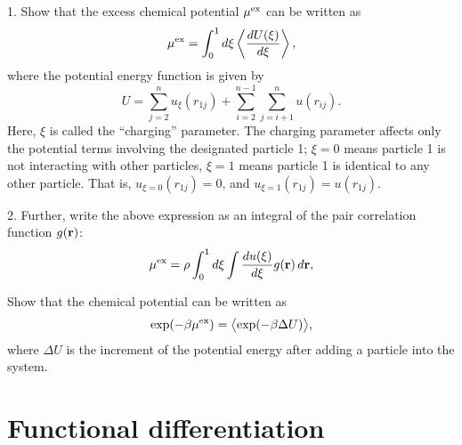 \documentclass[12pt]{book}
\begin{document}






1. Show that the excess chemical potential ${ { \mu }^{ \mathrm{ex} } }$ can be written as
\begin{equation}
  { { \mu }^{ \mathrm{ex} } }
=
  \int_0^1 d\xi \left\langle \frac{d U(\xi)}{d\xi} \right\rangle,
  \label{eq:muti}
\end{equation}
%
where the potential energy function is given by
\[
  U =
  \sum_{j = 2}^n u_\xi(r_{1j})
  +
  \sum_{i = 2}^{n - 1} \sum_{j = i+1}^n u(r_{ij}).
\]
%
Here, $\xi$ is called the ``charging'' parameter.
%
The charging parameter affects only the potential terms involving
the designated particle 1;
$\xi = 0$ means particle 1 is not interacting with other particles,
$\xi = 1$ means particle 1 is identical to any other particle.
%
That is,
$u_{\xi = 0}(r_{1j}) = 0$,
and
$u_{\xi = 1}(r_{1j}) = u(r_{1j})$.

2. Further, write the above expression as an integral of
the pair correlation function $g(\boldsymbol{\mathbf{r}})$:
\begin{equation}
  { { \mu }^{ \mathrm{ex} } }
=
  \rho \int_0^1 d\xi \int \frac{d u(\xi)}{d\xi} g(\boldsymbol{\mathbf{r}}) \, d\boldsymbol{\mathbf{r}},
  \label{eq:mutigr}
\end{equation}




Show that the chemical potential can be written as
\begin{equation}
  \exp(-\beta { { \mu }^{ \mathrm{ex} } })
=
  \bigl\langle
    \exp( -\beta \Delta U )
  \bigr\rangle,
\end{equation}
%
where $\Delta U$ is the increment of the potential energy
after adding a particle into the system.



\chapter{Functional differentiation}
\end{document}
